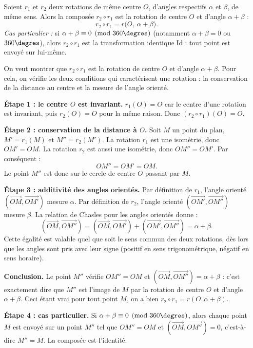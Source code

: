 \documentclass[11pt]{article}
\newcommand{\cle}[1]{{\popxbold\color{popdark}#1}}
\newcounter{popsec}
\newcounter{popsub}
\newcommand{\courssub}[1]{%
  \stepcounter{popsub}%
  \par\vspace{9pt}\noindent{\popxbold\fontsize{11.5}{13}\selectfont\color{popink}{\color{poporange}\thepopsec.\thepopsub}\hspace{6pt}#1}\par\nopagebreak\vspace{4pt}
}
\begin{document}
\courssub{Théorème fondamental}

\begin{propriete}
Soient $r_1$ et $r_2$ deux rotations de même centre $O$, d'angles respectifs $\alpha$ et $\beta$, de même sens. Alors la composée $r_2 \circ r_1$ est la \cle{rotation} de centre $O$ et d'angle $\alpha + \beta$ :
\[ r_2 \circ r_1 = r\bigl(O,\ \alpha + \beta\bigr). \]
\emph{Cas particulier :} si $\alpha + \beta \equiv 0 \pmod{360\degres}$ (notamment $\alpha + \beta = 0$ ou $360\degres$), alors $r_2 \circ r_1$ est la \cle{transformation identique} $\mathrm{Id}$ : tout point est envoyé sur lui-même.
\end{propriete}

\begin{experience}
On veut montrer que $r_2 \circ r_1$ est la rotation de centre $O$ et d'angle $\alpha + \beta$. Pour cela, on vérifie les deux conditions qui caractérisent une rotation : la conservation de la distance au centre et la mesure de l'angle orienté.

\textbf{Étape 1 : le centre $O$ est invariant.} $r_1(O) = O$ car le centre d'une rotation est invariant, puis $r_2(O) = O$ pour la même raison. Donc $(r_2 \circ r_1)(O) = O$.

\textbf{Étape 2 : conservation de la distance à $O$.} Soit $M$ un point du plan, $M' = r_1(M)$ et $M'' = r_2(M')$. La rotation $r_1$ est une isométrie, donc $OM' = OM$. La rotation $r_2$ est aussi une isométrie, donc $OM'' = OM'$. Par conséquent :
\[ OM'' = OM' = OM. \]
Le point $M''$ est donc sur le cercle de centre $O$ passant par $M$.

\textbf{Étape 3 : additivité des angles orientés.} Par définition de $r_1$, l'angle orienté $\left(\overrightarrow{OM}, \overrightarrow{OM'}\right)$ mesure $\alpha$. Par définition de $r_2$, l'angle orienté $\left(\overrightarrow{OM'}, \overrightarrow{OM''}\right)$ mesure $\beta$. La relation de Chasles pour les angles orientés donne :
\[ \left(\overrightarrow{OM}, \overrightarrow{OM''}\right) = \left(\overrightarrow{OM}, \overrightarrow{OM'}\right) + \left(\overrightarrow{OM'}, \overrightarrow{OM''}\right) = \alpha + \beta. \]
Cette égalité est valable quel que soit le sens commun des deux rotations, dès lors que les angles sont pris avec leur signe (positif en sens trigonométrique, négatif en sens horaire).

\textbf{Conclusion.} Le point $M''$ vérifie $OM'' = OM$ et $\left(\overrightarrow{OM}, \overrightarrow{OM''}\right) = \alpha + \beta$ : c'est exactement dire que $M''$ est l'image de $M$ par la rotation de centre $O$ et d'angle $\alpha + \beta$. Ceci étant vrai pour tout point $M$, on a bien $r_2 \circ r_1 = r(O, \alpha + \beta)$.

\textbf{Étape 4 : cas particulier.} Si $\alpha + \beta \equiv 0 \pmod{360\degres}$, alors chaque point $M$ est envoyé sur un point $M''$ tel que $OM'' = OM$ et $\left(\overrightarrow{OM}, \overrightarrow{OM''}\right) = 0$, c'est-à-dire $M'' = M$. La composée est l'identité.
\end{experience}
\end{document}
